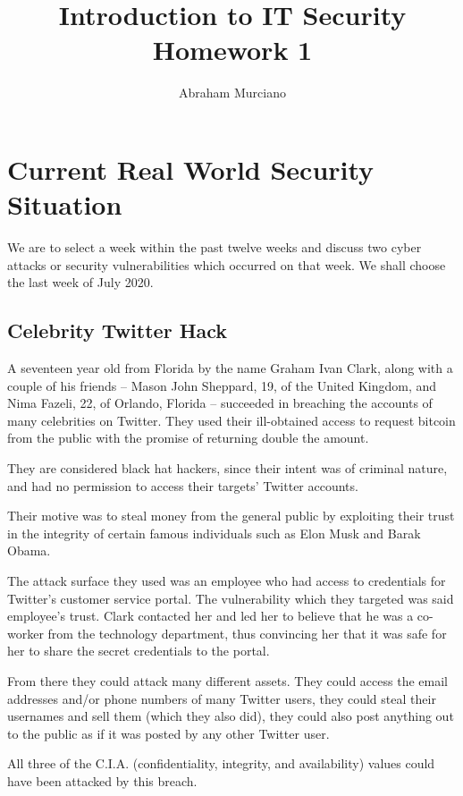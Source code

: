 \documentclass{article}
\title{Introduction to IT Security\\
\medskip
\large Homework 1}
\author{Abraham Murciano}
\begin{document}
\maketitle

\section{Current Real World Security Situation}

We are to select a week within the past twelve weeks and discuss two cyber attacks or security vulnerabilities which occurred on that week. We shall choose the last week of July 2020.

\subsection{Celebrity Twitter Hack}

A seventeen year old from Florida by the name Graham Ivan Clark, along with a couple of his friends -- Mason John Sheppard, 19, of the United Kingdom, and Nima Fazeli, 22, of Orlando, Florida -- succeeded in breaching the accounts of many celebrities on Twitter. They used their ill-obtained access to request bitcoin from the public with the promise of returning double the amount.

They are considered black hat hackers, since their intent was of criminal nature, and had no permission to access their targets' Twitter accounts.

Their motive was to steal money from the general public by exploiting their trust in the integrity of certain famous individuals such as Elon Musk and Barak Obama.

The attack surface they used was an employee who had access to credentials for Twitter's customer service portal. The vulnerability which they targeted was said employee's trust. Clark contacted her and led her to believe that he was a co-worker from the technology department, thus convincing her that it was safe for her to share the secret credentials to the portal.

From there they could attack many different assets. They could access the email addresses and/or phone numbers of many Twitter users, they could steal their usernames and sell them (which they also did), they could also post anything out to the public as if it was posted by any other Twitter user.

All three of the C.I.A. (confidentiality, integrity, and availability) values could have been attacked by this breach.
\end{document}
